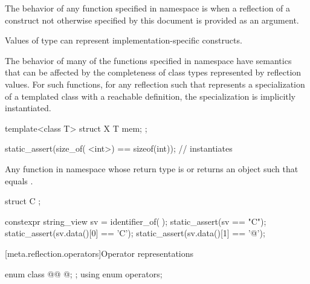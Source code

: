 \pnum
The behavior of any function specified in namespace  is
when a reflection of a construct not otherwise specified by this document
is provided as an argument.
\begin{note}
Values of type 
can represent implementation-specific constructs.
\end{note}
\begin{note}
The behavior of many of the functions specified in namespace 
have semantics that can be affected by
the completeness of class types represented by reflection values.
For such functions,
for any reflection  such that 
represents a specialization of a templated class with a reachable definition,
the specialization is implicitly instantiated.
\begin{example}
\begin{codeblock}
template<class T>
struct X {
  T mem;
};

static_assert(size_of(^^X<int>) == sizeof(int));    // instantiates 
\end{codeblock}
\end{example}
\end{note}

\pnum
Any function in namespace 
whose return type is  or 
returns an object  such that
 equals .
\begin{example}
\begin{codeblock}
struct C { };

constexpr string_view sv = identifier_of(^^C);
static_assert(sv == "C");
static_assert(sv.data()[0] == 'C');
static_assert(sv.data()[1] == '@');
\end{codeblock}
\end{example}

[meta.reflection.operators]{Operator representations}

\begin{itemdecl}
enum class @@ {
  @\seebelow@;
};
using enum operators;
\end{itemdecl}


